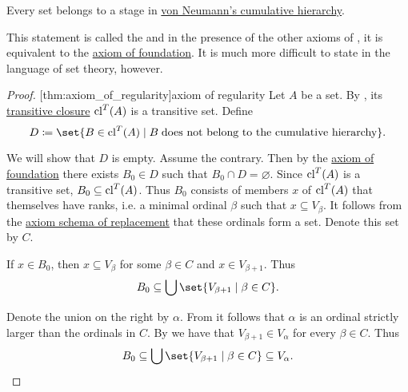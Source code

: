 \begin{theorem}\label{thm:axiom_of_regularity}
  Every set belongs to a stage in \hyperref[def:cumulative_hierarchy]{von Neumann's cumulative hierarchy}.

  This statement is called the  and in the presence of the other axioms of , it is equivalent to the \hyperref[def:zfc/foundation]{axiom of foundation}. It is much more difficult to state in the language of set theory, however.
\end{theorem}
\begin{proof}
  [thm:axiom_of_regularity]{axiom of regularity} Let \( A \) be a set. By , its \hyperref[def:transitive_closure_of_a_set]{transitive closure} \( \operatorname{cl}^T(A) \) is a transitive set. Define
  \begin{equation*}
    D \coloneqq \set{ B \in \cl^T(A) \given B \T{does not belong to the cumulative hierarchy} }.
  \end{equation*}

  We will show that \( D \) is empty. Assume the contrary. Then by the \hyperref[def:zfc/foundation]{axiom of foundation} there exists \( B_0 \in D \) such that \( B_0 \cap D = \varnothing \). Since \( \operatorname{cl}^T(A) \) is a transitive set, \( B_0 \subseteq \operatorname{cl}^T(A) \). Thus \( B_0 \) consists of members \( x \) of \( \operatorname{cl}^T(A) \) that themselves have ranks, i.e. a minimal ordinal \( \beta \) such that \( x \subseteq V_\beta \). It follows from the \hyperref[def:zfc/replacement]{axiom schema of replacement} that these ordinals form a set. Denote this set by \( C \).

  If \( x \in B_0 \), then \( x \subseteq V_\beta \) for some \( \beta \in C \) and \( x \in V_{\beta + 1} \). Thus
  \begin{equation*}
    B_0 \subseteq \bigcup\set{ V_{\beta + 1} \given \beta \in C }.
  \end{equation*}

  Denote the union on the right by \( \alpha \). From  it follows that \( \alpha \) is an ordinal strictly larger than the ordinals in \( C \). By  we have that \( V_{\beta + 1} \in V_\alpha \) for every \( \beta \in C \). Thus
  \begin{equation*}
    B_0 \subseteq \bigcup\set{ V_{\beta + 1} \given \beta \in C } \subseteq V_\alpha.
  \end{equation*}


\end{proof}
